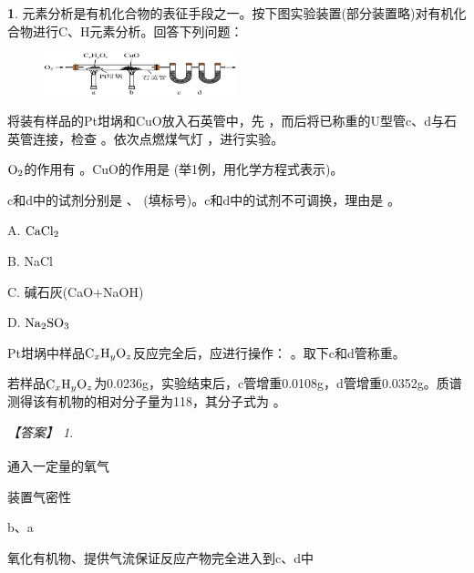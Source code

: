 \documentclass[UTF8, 10pt, a4paper, oneside]{ctexart}
\newcommand{\blank}{ \underbar{\quad$\blacktriangle$\quad} }%
\newcommand{\fs}[1]{{\fangsong #1}}%
\theoremstyle{definition}
\newtheorem{subexercise}{}[exercise]%
\theoremstyle{remark}
\newtheorem*{answer}{【答案】}
\theoremstyle{plain}
\begin{document}
\begin{subexercise}
    \fs{[2023全国乙26]}元素分析是有机化合物的表征手段之一。按下图实验装置(部分装置略)对有机化合物进行C、H元素分析。回答下列问题：
    \begin{figure}[ht!]
        \centering
        \includegraphics[width=0.5\textwidth, keepaspectratio]{assists/7.2.1.png}
    \end{figure}
    \begin{asparaenum}[(1)]
        \item 将装有样品的Pt坩埚和CuO放入石英管中，先\blank ，而后将已称重的U型管c、d与石英管连接，检查\blank 。依次点燃煤气灯\blank ，进行实验。
        \item $\ce{O2}$的作用有\blank 。CuO的作用是\blank (举1例，用化学方程式表示)。
        \item c和d中的试剂分别是\blank 、\blank (填标号)。c和d中的试剂不可调换，理由是\blank 。
        \begin{center}
            \begin{inparaenum}[\qquad A. ]
                \item[A. ] $\ce{CaCl2}$
                \item[\qquad B. ] NaCl
                \item[\qquad C. ] 碱石灰(CaO+NaOH)
                \item[\qquad D. ] $\ce{Na2SO3}$
            \end{inparaenum}
        \end{center}
        \item Pt坩埚中样品$\ce{C_xH_yO_z}$反应完全后，应进行操作：\blank 。取下c和d管称重。
        \item 若样品$\ce{C_xH_yO_z}$为0.0236g，实验结束后，c管增重0.0108g，d管增重0.0352g。质谱测得该有机物的相对分子量为118，其分子式为\blank 。
    \end{asparaenum}
    \begin{answer}
        \begin{inparaenum}
            \item[\setcounter{enumi}{1}\textsuperscript{\arabic{enumi}}] 通入一定量的氧气
            \item 装置气密性
            \item b、a
            \item 氧化有机物、提供气流保证反应产物完全进入到c、d中

\end{inparaenum}
\end{answer}
\end{subexercise}
\end{document}
